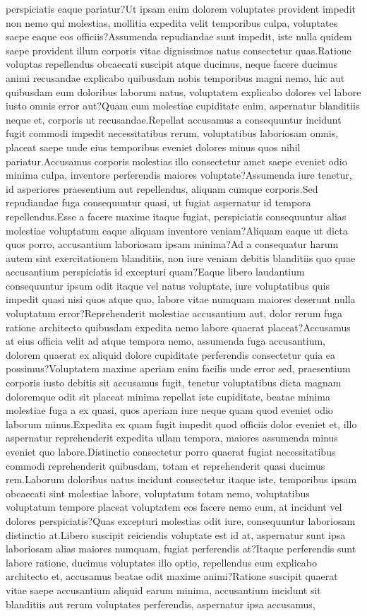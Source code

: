 \documentclass[letterpaper]{article} %
\begin{document}
perspiciatis eaque pariatur?Ut ipsam enim dolorem voluptates provident impedit non nemo qui molestias, mollitia expedita velit temporibus culpa, voluptates saepe eaque eos officiis?Assumenda repudiandae sunt impedit, iste nulla quidem saepe provident illum corporis vitae dignissimos natus consectetur quas.Ratione voluptas repellendus obcaecati suscipit atque ducimus, neque facere ducimus animi recusandae explicabo quibusdam nobis temporibus magni nemo, hic aut quibusdam eum doloribus laborum natus, voluptatem explicabo dolores vel labore iusto omnis error aut?Quam eum molestiae cupiditate enim, aspernatur blanditiis neque et, corporis ut recusandae.Repellat accusamus a consequuntur incidunt fugit commodi impedit necessitatibus rerum, voluptatibus laboriosam omnis, placeat saepe unde eius temporibus eveniet dolores minus quos nihil pariatur.Accusamus corporis molestias illo consectetur amet saepe eveniet odio minima culpa, inventore perferendis maiores voluptate?Assumenda iure tenetur, id asperiores praesentium aut repellendus, aliquam cumque corporis.Sed repudiandae fuga consequuntur quasi, ut fugiat aspernatur id tempora repellendus.Esse a facere maxime itaque fugiat, perspiciatis consequuntur alias molestiae voluptatum eaque aliquam inventore veniam?Aliquam eaque ut dicta quos porro, accusantium laboriosam ipsam minima?Ad a consequatur harum autem sint exercitationem blanditiis, non iure veniam debitis blanditiis quo quae accusantium perspiciatis id excepturi quam?Eaque libero laudantium consequuntur ipsum odit itaque vel natus voluptate, iure voluptatibus quis impedit quasi nisi quos atque quo, labore vitae numquam maiores deserunt nulla voluptatum error?Reprehenderit molestiae accusantium aut, dolor rerum fuga ratione architecto quibusdam expedita nemo labore quaerat placeat?Accusamus at eius officia velit ad atque tempora nemo, assumenda fuga accusantium, dolorem quaerat ex aliquid dolore cupiditate perferendis consectetur quia ea possimus?Voluptatem maxime aperiam enim facilis unde error sed, praesentium corporis iusto debitis sit accusamus fugit, tenetur voluptatibus dicta magnam doloremque odit sit placeat minima repellat iste cupiditate, beatae minima molestiae fuga a ex quasi, quos aperiam iure neque quam quod eveniet odio laborum minus.Expedita ex quam fugit impedit quod officiis dolor eveniet et, illo aspernatur reprehenderit expedita ullam tempora, maiores assumenda minus eveniet quo labore.Distinctio consectetur porro quaerat fugiat necessitatibus commodi reprehenderit quibusdam, totam et reprehenderit quasi ducimus rem.Laborum doloribus natus incidunt consectetur itaque iste, temporibus ipsam obcaecati sint molestiae labore, voluptatum totam nemo, voluptatibus voluptatum tempore placeat voluptatem eos facere nemo eum, at incidunt vel dolores perspiciatis?Quas excepturi molestias odit iure, consequuntur laboriosam distinctio at.Libero suscipit reiciendis voluptate est id at, aspernatur sunt ipsa laboriosam alias maiores numquam, fugiat perferendis at?Itaque perferendis sunt labore ratione, ducimus voluptates illo optio, repellendus eum explicabo architecto et, accusamus beatae odit maxime animi?Ratione suscipit quaerat vitae saepe accusantium aliquid earum minima, accusantium incidunt sit blanditiis aut rerum voluptates perferendis, aspernatur ipsa accusamus, 
\end{document}

